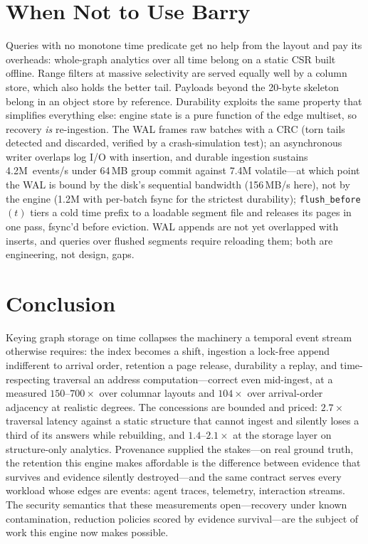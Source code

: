 \documentclass[11pt,letterpaper,twocolumn]{article}
\begin{document}
\section{When Not to Use Barry}
\label{sec:limits}
Queries with no monotone time predicate get no help from the layout
and pay its overheads: whole-graph analytics over all time belong on
a static CSR built offline. Range filters at massive selectivity are
served equally well by a column store, which also holds the better
tail. Payloads beyond the 20-byte skeleton belong in an object store
by reference. Durability exploits the same property that simplifies
everything else: engine state is a pure function of the edge
multiset, so recovery \emph{is} re-ingestion. The WAL frames raw
batches with a CRC (torn tails detected and discarded, verified by a
crash-simulation test); an asynchronous writer overlaps log I/O with
insertion, and durable ingestion sustains 4.2M~events/s under 64\,MB
group commit against 7.4M volatile---at which point the WAL is bound
by the disk's sequential bandwidth (156\,MB/s here), not by the
engine (1.2M with per-batch fsync for the strictest durability);
\texttt{flush\_before}$(t)$ tiers a cold time prefix to a loadable
segment file and releases its pages in one pass, fsync'd before
eviction. WAL appends are not yet overlapped with inserts, and
queries over flushed segments require reloading them; both are
engineering, not design, gaps.

\section{Conclusion}
Keying graph storage on time collapses the machinery a temporal event
stream otherwise requires: the index becomes a shift, ingestion a
lock-free append indifferent to arrival order, retention a page
release, durability a replay, and time-respecting traversal an
address computation---correct even mid-ingest, at a measured
$150$--$700\times$ over columnar layouts and $104\times$ over
arrival-order adjacency at realistic degrees. The concessions are
bounded and priced: $2.7\times$ traversal latency against a static
structure that cannot ingest and silently loses a third of its
answers while rebuilding, and $1.4$--$2.1\times$ at the storage layer
on structure-only analytics. Provenance supplied the stakes---on
real ground truth, the retention this engine makes affordable is the
difference between evidence that survives and evidence silently
destroyed---and the same contract serves every workload whose edges
are events: agent traces, telemetry, interaction streams. The
security semantics that these measurements open---recovery under
known contamination, reduction policies scored by evidence
survival---are the subject of work this engine now makes possible.



\end{document}
